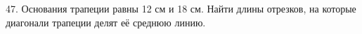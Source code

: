 47. Основания трапеции равны 12 см и 18 см. Найти длины отрезков, на которые диагонали трапеции делят её среднюю линию.\\
